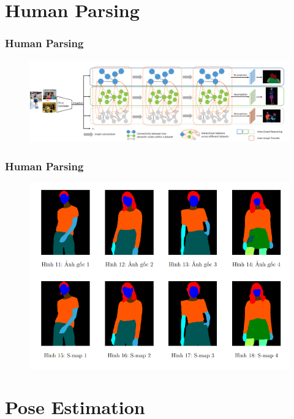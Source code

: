 \documentclass{beamer}
\begin{document}
\section{Human Parsing} 

\begin{frame}
\frametitle{Human Parsing}

\begin{figure}
    \centering
    \includegraphics[width=1\linewidth]{p2.png}
    
    
\end{figure}

\end{frame}

\begin{frame}
\frametitle{Human Parsing}

\begin{figure}
    \centering
    \includegraphics[width=1\linewidth]{p3.png}
    
    
\end{figure}

\end{frame}


\section{Pose Estimation} 
\end{document}
